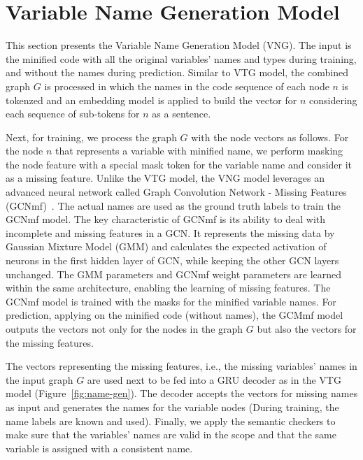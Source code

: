 \section{Variable Name Generation Model}
\label{sec:name-gen}

This section presents the Variable Name Generation Model (VNG).  The
input is the minified code with all the original variables' names and
types during training, and without the names during
prediction. Similar to VTG model, the combined graph $G$ is processed
in which the names in the code sequence of each node $n$ is tokenzed
and an embedding model is applied to build the vector for $n$
considering each sequence of sub-tokens for $n$ as a sentence.

Next, for training, we process the graph $G$ with the node vectors as
follows. For the node $n$ that represents a variable with minified
name, we perform masking the node feature with a special mask token
for the variable name and consider it as a missing feature. Unlike the
VTG model, the VNG model leverages an advanced neural network called
Graph Convolution Network - Missing Features (GCNmf)~\cite{GCNmf}.
The actual names are used as the ground truth labels to train the
GCNmf model. The key characteristic of GCNmf is its ability to deal
with incomplete and missing features in a GCN. It represents the
missing data by Gaussian Mixture Model (GMM) and calculates the
expected activation of neurons in the first hidden layer of GCN, while
keeping the other GCN layers unchanged. The GMM parameters and GCNmf
weight parameters are learned within the same architecture, enabling
the learning of missing features. The GCNmf model is trained with the
masks for the minified variable names. For prediction, applying on the
minified code (without names), the GCMmf model outputs the vectors not
only for the nodes in the graph $G$ but also the vectors for the
missing features.

The vectors representing the missing features, i.e., the missing
variables' names in the input graph $G$ are used next to be fed into a
GRU decoder as in the VTG model (Figure~\ref{fig:name-gen}). The
decoder accepts the vectors for missing names as input and generates
the names for the variable nodes (During training, the name labels are
known and used). Finally, we apply the semantic checkers to make sure
that the variables' names are valid in the scope and that the same
variable is assigned with a consistent name.



